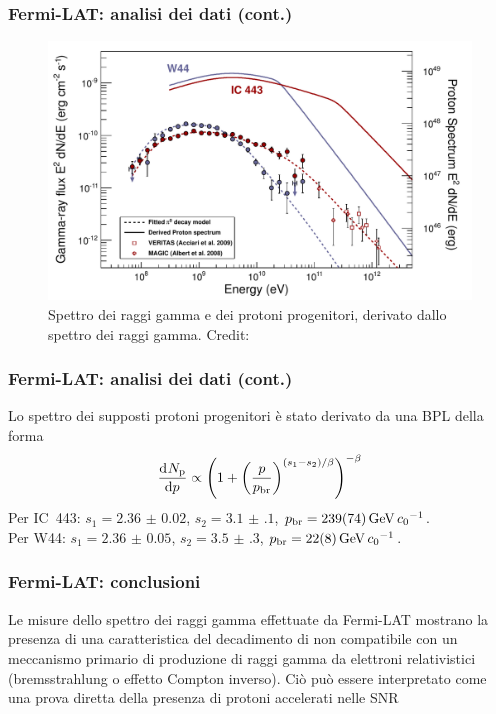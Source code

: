 \documentclass[10pt]{beamer}
\newcommand*{\dd}{\mathop{}\!\textup{d}} %
\newcommand*{\toder}[3][]{\frac{{\dd^{#1}}#2}{\dd {#3}^{#1}}}
\begin{document}
\begin{frame}
  \frametitle{Fermi-LAT: analisi dei dati (cont.)}
  \begin{figure}
    \centering
    \includegraphics[width=.8\columnwidth]{1231160fig3}
    \caption{Spettro dei raggi gamma e dei protoni progenitori, derivato dallo
      spettro dei raggi gamma.  Credit: \textcite{2013Sci...339..807A}}
  \end{figure}
\end{frame}

\begin{frame}
  \frametitle{Fermi-LAT: analisi dei dati (cont.)}
  Lo spettro dei supposti protoni progenitori è stato derivato da una BPL della
  forma
  \begin{equation*}
    \toder{N_{\textup{p}}}{p} \propto
    \left(
      1 +
      \left(
        \frac{p}{p_{\textup{br}}}
      \right)^{(s_{1} - s_{2})/\beta}
    \right)^{-\beta}
  \end{equation*}
  Per IC~443: $s_{1} = \num{2.36(2)}$, $s_{2} = \num{3.1(1)}$,
  $p_{\textup{br}} = \SI{239(74)}{\giga \electronvolt \per \clight}$.  \\
  Per W44: $s_{1} = \num{2.36(5)}$, $s_{2} = \num{3.5(3)}$,
  $p_{\textup{br}} = \SI{22(8)}{\giga \electronvolt \per \clight}$.
\end{frame}

\begin{frame}
  \frametitle{Fermi-LAT: conclusioni}
  Le misure dello spettro dei raggi gamma effettuate da Fermi-LAT mostrano la
  presenza di una \alert{caratteristica del decadimento di \PGpz} non
  compatibile con un meccanismo primario di produzione di raggi gamma da
  elettroni relativistici (bremsstrahlung o effetto Compton inverso).  Ciò può
  essere interpretato come una
  \alert{prova diretta della presenza di protoni accelerati} nelle SNR
\end{frame}
\end{document}
